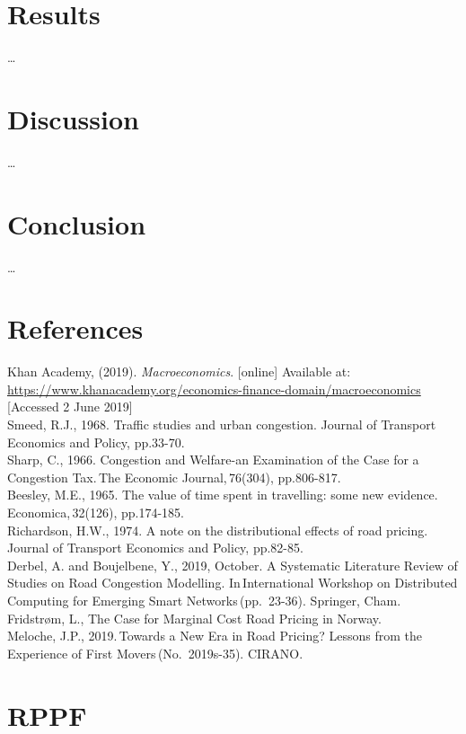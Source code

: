 \documentclass[
      a4paper,
        12pt,
          oneside,
      ]{article}
\begin{document}
\hypertarget{results}{%
\section{Results}\label{results}}

\ldots{}

\hypertarget{discussion}{%
\section{Discussion}\label{discussion}}

\ldots{}

\hypertarget{conclusion}{%
\section{Conclusion}\label{conclusion}}

\ldots{}

\hypertarget{references}{%
\section{References}\label{references}}

Khan Academy, (2019). \emph{Macroeconomics}. {[}online{]} Available at:
\url{https://www.khanacademy.org/economics-finance-domain/macroeconomics}
{[}Accessed 2 June 2019{]}\\
Smeed, R.J., 1968. Traffic studies and urban congestion. Journal of
Transport Economics and Policy, pp.33-70.\\
Sharp, C., 1966. Congestion and Welfare-an Examination of the Case for a
Congestion Tax.\,The Economic Journal,\,76(304), pp.806-817.\\
Beesley, M.E., 1965. The value of time spent in travelling: some new
evidence.\,Economica,\,32(126), pp.174-185.\\
Richardson, H.W., 1974. A note on the distributional effects of road
pricing.\,Journal of Transport Economics and Policy, pp.82-85.\\
Derbel, A. and Boujelbene, Y., 2019, October. A Systematic Literature
Review of Studies on Road Congestion Modelling. In\,International
Workshop on Distributed Computing for Emerging Smart
Networks\,(pp.~23-36). Springer, Cham. Fridstrøm, L., The Case for
Marginal Cost Road Pricing in Norway.\\
Meloche, J.P., 2019.\,Towards a New Era in Road Pricing? Lessons from
the Experience of First Movers\,(No.~2019s-35). CIRANO.

\hypertarget{rppf}{%
\section{RPPF}\label{rppf}}
\end{document}
